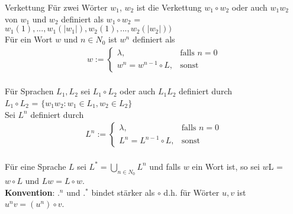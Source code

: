 \begin{defn}{Verkettung} 
    Für zwei Wörter $w_1$, $w_2$ ist die Verkettung $w_1 \circ w_2$ oder 
    auch $w_1$$w_2$ von $w_1$ und $w_2$ definiert als $w_1 \circ w_2$ = $w_1(1),...,w_1(\vert w_1 \vert),w_2(1),...,w_2(\vert w_2 \vert))$ \\

    Für ein Wort $w$ und $n \in N_0$ ist $w^n$ definiert als \\
        \begin{align*}    
            w := 
            \begin{cases} 
                \lambda, & \text{falls } n = 0 \\ 
                w^n = w^{n-1} \circ L, &\text{sonst} 
            \end{cases}
        \end{align*} \\

    Für Sprachen $L_1, L_2$ sei $L_1 \circ L_2$ oder auch $L_1L_2$ definiert durch  \\
    $L_1 \circ L_2$ = $\{w_1w_2: w_1 \in L_1, w_2 \in L_2\}$ \\

    Sei $L^n$ definiert durch \\
        \begin{align*}  
            L^n :=
            \begin{cases} 
                \lambda, & \text{falls } n = 0 \\ 
                L^n = L^{n-1} \circ L, &\text{sonst} 
            \end{cases}
        \end{align*}\\

    Für eine Sprache $L$ sei $L^*= \bigcup\limits_{n \in N_0} L^n$ und falls $w$ ein Wort ist, so sei $w$L = $w \circ L$ und $Lw = L \circ w$. \\
        
    \textbf{Konvention}: $.^n$ und $.^*$ bindet stärker als $\circ$ d.h. für Wörter $u,v$ ist $u^nv = (u^n)\circ v$.
\end{defn}
